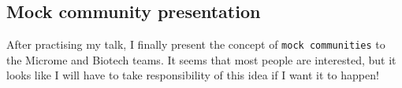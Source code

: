 \subsection{Mock community presentation}
\label{task:20180112_cj0}

After practising my talk, I finally present the concept of \texttt{mock communities} to the Microme and Biotech teams. It seems that most people are interested, but it looks like I will have to take responsibility of this idea if I want it to happen!

